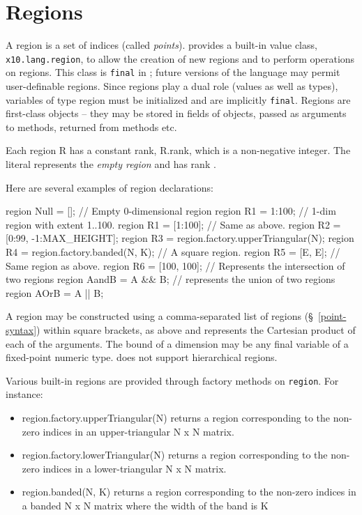 \section{Regions}\label{XtenRegions}

A region is a set of indices (called {\em points}).  {}\Xten{}
provides a built-in value class, {\tt x10.lang.region}, to allow the
creation of new regions and to perform operations on regions. This
class is {\tt final} in {}\XtenCurrVer; future versions of the
language may permit user-definable regions. Since regions play a dual
role (values as well as types), variables of type {\cf region} must be
initialized and are implicitly {\tt final}. Regions are first-class
objects -- they may be stored in fields of objects, passed as
arguments to methods, returned from methods etc.

Each region {\cf R} has a constant rank, {\cf R.rank}, which is a
non-negative integer. The literal {\cf []} represents the {\em empty
region} and has rank {}.

Here are several examples of region declarations:
\begin{x10}
region Null = [];  // Empty 0-dimensional region          
region R1 = 1:100; // 1-dim region with extent 1..100.
region R1 = [1:100]; // Same as above.
region R2 = [0:99, -1:MAX\_HEIGHT];   
region R3 = region.factory.upperTriangular(N);
region R4 = region.factory.banded(N, K);
   // A square region.
region R5 = [E, E];           
   // Same region as above.
region R6 = [100, 100];       
   // Represents the intersection of two regions
region AandB = A \&\& B;       
  // represents the union of two regions
region AOrB = A || B;        
\end{x10}

A region may be constructed using a comma-separated list of regions
(\S~\ref{point-syntax}) within square brackets, as above and represents
the Cartesian product of each of the arguments.  The bound of a
dimension may be any final variable of a fixed-point numeric
type. \XtenCurrVer{} does not support hierarchical regions.

Various built-in regions are provided through  factory
methods on {\tt region}.  For instance:
\begin{itemize}
{}\item {\cf region.factory.upperTriangular(N)} returns a region corresponding
to the non-zero indices in an upper-triangular {\cf N x N} matrix.
{}\item {\cf region.factory.lowerTriangular(N)} returns a region corresponding
to the non-zero indices in a lower-triangular {\cf N x N} matrix.
{}\item {\cf region.banded(N, K)} returns a region corresponding to
the non-zero indices in a banded {\cf N x N} matrix where the width of
the band is {\cf K}
\end{itemize}

